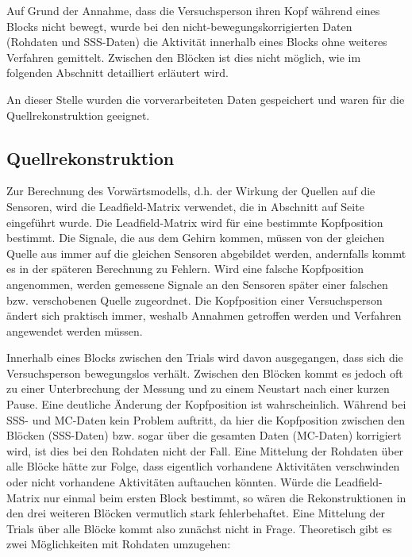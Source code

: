 \documentclass[doc,a4paper,12pt]{apa6}
\makeatletter
\DeclareRobustCommand*{\nameref}[1]{%
      \glqq{\myorg@nameref{#1}}\grqq%
    }%
\makeatother
\begin{document}
Auf Grund der Annahme, dass die Versuchsperson ihren Kopf während eines Blocks nicht bewegt, wurde bei den nicht-bewegungskorrigierten Daten (Rohdaten und SSS-Daten) die Aktivität innerhalb eines Blocks ohne weiteres Verfahren gemittelt. Zwischen den Blöcken ist dies nicht möglich, wie im folgenden Abschnitt detailliert erläutert wird.

An dieser Stelle wurden die vorverarbeiteten Daten gespeichert und waren für die Quellrekonstruktion geeignet.

\subsection{Quellrekonstruktion}
\label{sec:lead-beam-mne}

Zur Berechnung des Vorwärtsmodells, d.h. der Wirkung der Quellen auf die Sensoren, wird die Leadfield-Matrix verwendet, die in Abschnitt \nameref{sec:lead} auf Seite \pageref{sec:lead} eingeführt wurde. Die Leadfield-Matrix wird für eine bestimmte Kopfposition bestimmt. Die Signale, die aus dem Gehirn kommen, müssen von der gleichen Quelle aus immer auf die gleichen Sensoren abgebildet werden, andernfalls kommt es in der späteren Berechnung zu Fehlern. Wird eine falsche Kopfposition angenommen, werden gemessene Signale an den Sensoren später einer falschen bzw. verschobenen Quelle zugeordnet. Die Kopfposition einer Versuchsperson ändert sich praktisch immer, weshalb Annahmen getroffen werden und Verfahren angewendet werden müssen.

Innerhalb eines Blocks zwischen den Trials wird davon ausgegangen, dass sich die Versuchsperson bewegungslos verhält. Zwischen den Blöcken kommt es jedoch oft zu einer Unterbrechung der Messung und zu einem Neustart nach einer kurzen Pause. Eine deutliche Änderung der Kopfposition ist wahrscheinlich. Während bei SSS- und MC-Daten kein Problem auftritt, da hier die Kopfposition zwischen den Blöcken (SSS-Daten) bzw. sogar über die gesamten Daten (MC-Daten) korrigiert wird, ist dies bei den Rohdaten nicht der Fall. Eine Mittelung der Rohdaten über alle Blöcke hätte zur Folge, dass eigentlich vorhandene Aktivitäten verschwinden oder nicht vorhandene Aktivitäten auftauchen könnten. Würde die Leadfield-Matrix nur einmal beim ersten Block bestimmt, so wären die Rekonstruktionen in den drei weiteren Blöcken vermutlich stark fehlerbehaftet. Eine Mittelung der Trials über alle Blöcke kommt also zunächst nicht in Frage. Theoretisch gibt es zwei Möglichkeiten mit Rohdaten umzugehen:
\end{document}
